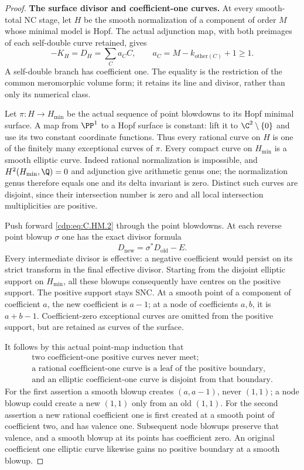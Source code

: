 \begin{proof}
\par\medskip\noindent\textbf{The surface divisor and coefficient-one curves.}
At every smooth-total NC stage, let \(H\) be the smooth
normalization of a component of order \(M\) whose minimal
model is Hopf.  The actual adjunction map, with both
preimages of each self-double curve retained, gives
\[
       -K_H=D_H=\sum_C a_C C,\qquad
       a_C=M-k_{\mathrm{other}(C)}+1\ge1 .
\tag{C.HM.2}\label{cdp:eq:C.HM.2}
\]
A self-double branch has coefficient one.  The equality
is the restriction of the common meromorphic volume
form; it retains its line and divisor, rather than only
its numerical class.

Let \(\pi:H\to H_{\min}\) be the actual sequence of point
blowdowns to its Hopf minimal surface.  A map from
\(\PP^1\) to a Hopf surface is constant: lift it to
\(\C^2\setminus\{0\}\) and use its two constant coordinate
functions.  Thus every rational curve on \(H\) is one
of the finitely many exceptional curves of \(\pi\).
Every compact curve on \(H_{\min}\) is a smooth elliptic
curve.  Indeed rational normalization is impossible,
and \(H^2(H_{\min},\Q)=0\) and adjunction give arithmetic
genus one; the normalization genus therefore equals
one and its delta invariant is zero.  Distinct such
curves are disjoint, since their intersection number
is zero and all local intersection multiplicities are
positive.

Push forward \eqref{cdp:eq:C.HM.2} through the point blowdowns.  At
each reverse point blowup \(\sigma\) one has the exact
divisor formula
\[
             D_{\mathrm{new}}=\sigma^*D_{\mathrm{old}}-E.
\tag{C.HM.3}\label{cdp:eq:C.HM.3}
\]
Every intermediate divisor is effective: a negative
coefficient would persist on its strict transform in
the final effective divisor.  Starting from the
disjoint elliptic support on \(H_{\min}\), all these
blowups consequently have centres on the positive
support.  The positive support stays SNC.  At a smooth
point of a component of coefficient \(a\), the new
coefficient is \(a-1\); at a node of coefficients
\(a,b\), it is \(a+b-1\).  Coefficient-zero exceptional
curves are omitted from the positive support, but are
retained as curves of the surface.

It follows by this actual point-map induction that
\[
 \begin{gathered}
 \text{two coefficient-one positive curves never meet;}\\
 \text{a rational coefficient-one curve is a leaf
 of the positive boundary,}\\
 \text{and an elliptic coefficient-one curve is
 disjoint from that boundary.}
 \end{gathered}
\tag{C.HM.4}\label{cdp:eq:C.HM.4}
\]
For the first assertion a smooth blowup creates
\((a,a-1)\), never \((1,1)\); a node blowup could
create a new \((1,1)\) only from an old \((1,1)\).
For the second assertion a new rational coefficient
one is first created at a smooth point of coefficient
two, and has valence one.  Subsequent node blowups
preserve that valence, and a smooth blowup at its
points has coefficient zero.  An original coefficient
one elliptic curve likewise gains no positive boundary
at a smooth blowup.


\end{proof}

